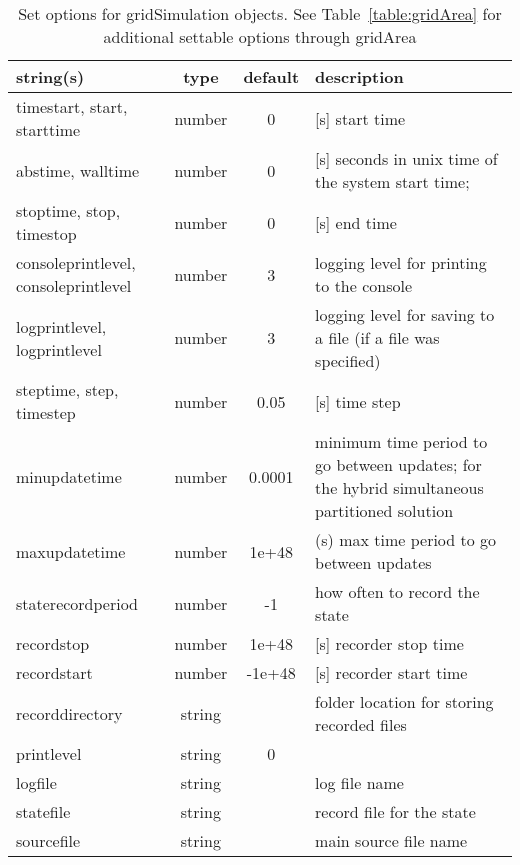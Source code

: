 \begin{table}[ht]
\centering
\begin{tabular}{p{5cm} c c p{7cm}}
\hline
string(s) & type & default & description \\
\hline
timestart, start, starttime & number & 0 & [s]  start time\\
abstime, walltime & number & 0 & [s] seconds in unix time of the system start time;\\
stoptime, stop, timestop & number & 0 & [s]  end time\\
consoleprintlevel, consoleprintlevel & number & 3 & logging level for printing to the console\\
logprintlevel, logprintlevel & number & 3 & logging level for saving to a file (if a file was specified)\\
steptime, step, timestep & number & 0.05 & [s]  time step\\
minupdatetime & number & 0.0001 & minimum time period to go between updates; for the hybrid simultaneous partitioned solution\\
maxupdatetime & number & 1e+48 & (s) max time period to go between updates\\
staterecordperiod & number & -1 & how often to record the state\\
recordstop & number & 1e+48 & [s]  recorder stop time\\
recordstart & number & -1e+48 & [s]  recorder start time\\
recorddirectory & string &  & folder location for storing recorded files\\
printlevel & string & 0 & \\
logfile & string &  & log file name\\
statefile & string &  & record file for the state\\
sourcefile & string &  & main source file name\\
\hline
\end{tabular}
\caption{Set options for gridSimulation objects. See Table~\ref{table:gridArea} for additional settable options through gridArea}
\label{table:gridSimulation}
\end{table}
